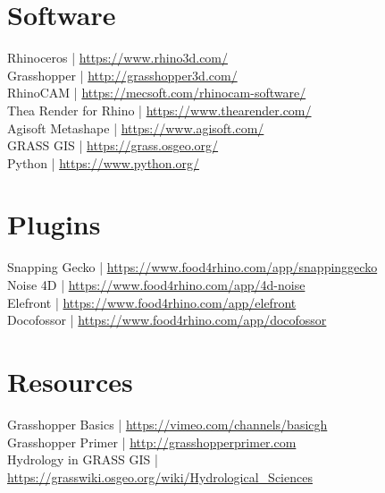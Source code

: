 \documentclass[11pt,article,oneside]{memoir}
\begin{document}
\section{Software}

Rhinoceros | \url{https://www.rhino3d.com/}\\
Grasshopper | \url{http://grasshopper3d.com/}\\
RhinoCAM | \url{https://mecsoft.com/rhinocam-software/}\\
Thea Render for Rhino | \url{https://www.thearender.com/}\\
Agisoft Metashape | \url{https://www.agisoft.com/}\\
GRASS GIS | \url{https://grass.osgeo.org/}\\
Python | \url{https://www.python.org/}\\

\section{Plugins}
Snapping Gecko | \url{https://www.food4rhino.com/app/snappinggecko}\\
Noise 4D | \url{https://www.food4rhino.com/app/4d-noise}\\
Elefront | \url{https://www.food4rhino.com/app/elefront}\\
Docofossor | \url{https://www.food4rhino.com/app/docofossor}\\

\section{Resources}

Grasshopper Basics | \url{https://vimeo.com/channels/basicgh}\\
Grasshopper Primer | \url{http://grasshopperprimer.com}\\
Hydrology in GRASS GIS | \url{https://grasswiki.osgeo.org/wiki/Hydrological_Sciences}\\
\end{document}
